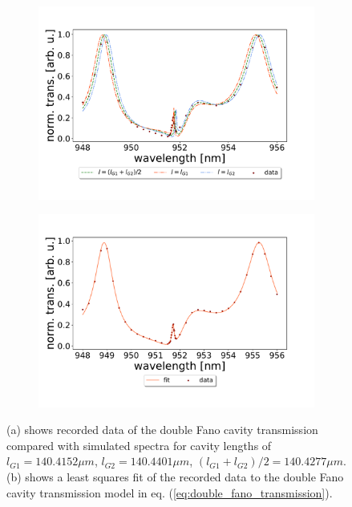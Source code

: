 \begin{figure}[h!]
    \centering
    \begin{subfigure}[b]{0.49\textwidth}
        \centering
        \includegraphics[width=\textwidth]{figures/results/129um_long_scan_sim_comparison.pdf}
        \caption{}
        \label{fig:129um_long_scan_sim_comparison}
    \end{subfigure}
    \begin{subfigure}[b]{0.49\textwidth}
        \centering
        \includegraphics[width=\textwidth]{figures/results/129um_long_scan_fit.pdf}
        \caption{}
        \label{fig:129um_long_scan_fit}
    \end{subfigure}
    \caption{(a) shows recorded data of the double Fano cavity transmission compared with simulated spectra for cavity lengths of $l_{G1} = 140.4152 \mu m$, $l_{G2} = 140.4401 \mu m$, $(l_{G1} + l_{G2})/2 = 140.4277 \mu m$. (b) shows a least squares fit of the recorded data to the double Fano cavity transmission model in eq. (\ref{eq:double_fano_transmission}).}
    \label{fig:129um_cavity_fit_and_sim}
\end{figure}

